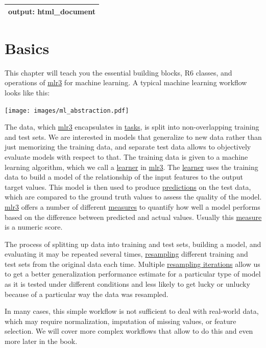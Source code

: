 \documentclass[]{article}
\begin{document}
\begin{longtable}[]{@{}l@{}}
\toprule
\endhead
output: html\_document\tabularnewline
\bottomrule
\end{longtable}

\hypertarget{basics}{%
\section{Basics}\label{basics}}

This chapter will teach you the essential building blocks, R6 classes, and operations of \href{https://mlr3.mlr-org.com}{mlr3} for machine learning.
A typical machine learning workflow looks like this:

\texttt{[image: images/ml\_abstraction.pdf]}

The data, which \href{https://mlr3.mlr-org.com}{mlr3} encapsulates in \protect\hyperlink{tasks}{tasks}, is split into non-overlapping training and test sets.
We are interested in models that generalize to new data rather than just memorizing the training data, and separate test data allows to objectively evaluate models with respect to that.
The training data is given to a machine learning algorithm, which we call a \protect\hyperlink{learners}{learner} in \href{https://mlr3.mlr-org.com}{mlr3}.
The \protect\hyperlink{learners}{learner} uses the training data to build a model of the relationship of the input features to the output target values.
This model is then used to produce \protect\hyperlink{predicting}{predictions} on the test data, which are compared to the ground truth values to assess the quality of the model.
\href{https://mlr3.mlr-org.com}{mlr3} offers a number of different \protect\hyperlink{measure}{measures} to quantify how well a model performs based on the difference between predicted and actual values.
Usually this \protect\hyperlink{measure}{measure} is a numeric score.

The process of splitting up data into training and test sets, building a model, and evaluating it may be repeated several times, \protect\hyperlink{resampling}{resampling} different training and test sets from the original data each time.
Multiple \protect\hyperlink{resampling}{resampling iterations} allow us to get a better generalization performance estimate for a particular type of model as it is tested under different conditions and less likely to get lucky or unlucky because of a particular way the data was resampled.

In many cases, this simple workflow is not sufficient to deal with real-world data, which may require normalization, imputation of missing values, or feature selection.
We will cover more complex workflows that allow to do this and even more later in the book.
\end{document}
